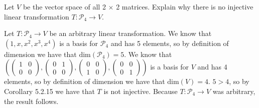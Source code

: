 \documentclass[12pt]{article}
\newenvironment{problem}[2][Problem]
{
	\begin{trivlist} 
		\item[\hskip \labelsep {\bfseries #1 #2:}]
	}
{
	\end{trivlist}
	}
\newenvironment{solution}[1][Solution]
{
	\begin{trivlist} 
		\item[\hskip \labelsep {\itshape #1:}]
	}
	{
	\end{trivlist}
}
\begin{document}
\newpage
\begin{problem}{2}
Let $V$ be the vector space of all 2 $\times$ 2 matrices. Explain why there is no injective linear transformation $T:\mathcal{P}_4 \to V$.
\noindent
\newline
\newline
\begin{solution}
Let $T:\mathcal{P}_4 \to V$ be an arbitrary linear transformation. We know that $(1,x,x^2,x^3,x^4)$ is a basis for $\mathcal{P}_4$ and has 5 elements, so by definition of dimension we have that $\text{dim}(\mathcal{P}_4)=5$. We know that $\left( \begin{pmatrix}1&0\\0&0 \end{pmatrix}, \begin{pmatrix}0&1\\0&0 \end{pmatrix}, \begin{pmatrix}0&0\\1&0 \end{pmatrix}, \begin{pmatrix}0&0\\0&1 \end{pmatrix} \right)$ is a basis for $V$ and has 4 elements, so by definition of dimension we have that $\text{dim}(V)=4$. $5>4$, so by Corollary 5.2.15 we have that $T$ is not injective. Because $T:\mathcal{P}_4 \to V$ was arbitrary, the result follows.
\end{solution}
\end{problem}
\end{document}
